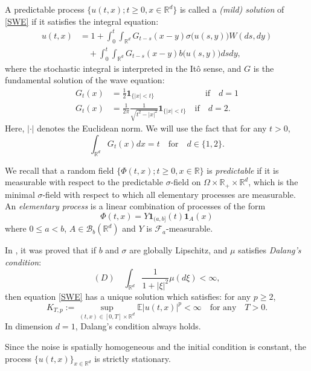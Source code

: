 \documentclass[12pt]{article}
\def\cB{\mathcal{B}}
\def\cF{\mathcal{F}}
\def\bE{\mathbb{E}}
\def\bR{\mathbb{R}}
\begin{document}
A predictable process $\{u(t,x);t\geq 0,x\in \bR^d\}$ is called a {\em (mild) solution} of \eqref{SWE}
if it satisfies the integral equation:
\begin{align}
\nonumber
u(t,x) & =1+\int_0^t \int_{\bR^d}G_{t-s}(x-y)\sigma\big(u(s,y)\big) W(ds,dy) \\
\label{mild soln}
& \quad +\int_0^t \int_{\bR^d} G_{t-s}(x-y) b\big(u(s,y)\big)dsdy,
\end{align}
where the stochastic integral is interpreted in the It\^o sense, and $G$ is the fundamental solution of the wave equation:
\begin{align*}
G_t(x)&=\frac{1}{2}\mathbf 1_{\{|x|<t\}} \quad \quad \quad \quad \quad \quad \mbox{if} \quad d=1\\
G_t(x)& =\frac{1}{2\pi} \frac{1}{\sqrt{t^2-|x|^2}} \mathbf 1_{\{|x|<t\}} \quad \mbox{if} \quad d=2.
\end{align*}
Here, $|\cdot|$ denotes the Euclidean norm. We will use the fact that for any $t>0$,
\begin{equation}
\label{int-G}
\int_{\bR^d}G_t(x)dx=t \quad \mbox{for} \quad d \in \{1,2\}.
\end{equation}




We recall that a random field $\{\Phi(t,x);t\geq 0,x\in \bR\}$ is {\em predictable} if it is measurable with respect to the predictable $\sigma$-field on $\Omega \times \bR_{+} \times \bR^d$, which is the minimal $\sigma$-field with respect to which all elementary processes are measurable. An {\em elementary process} is a linear combination of processes of the form
\[
\Phi(t,x)=Y \mathbf 1_{(a,b]}(t) \mathbf 1_{A}(x)
\]
where  $0\leq a<b$, $A \in \cB_b(\bR^d)$ and $Y$ is $\cF_a$-measurable. 




In \cite{dalang99}, it was proved that if $b$ and $\sigma$ are globally Lipschitz, and $\mu$ satisfies {\em Dalang's condition}:
\[
(D) \quad
\int_{\bR^d}\frac{1}{1+|\xi|^2}\mu(d\xi)<\infty,
\]
then equation \eqref{SWE} has a unique solution which satisfies: for any $p\geq 2$,
\begin{equation}
\label{def-KTp}
K_{T,p}:=\sup_{(t,x) \in [0,T] \times \bR^d}\bE|u(t,x)|^p<\infty \quad \mbox{for any} \quad T>0.
\end{equation}
In dimension $d=1$, Dalang's condition always holds. 

Since the noise is spatially homogeneous and the initial condition is constant, the process $\{u(t,x)\}_{x\in \bR^d}$ is strictly stationary.
\end{document}

